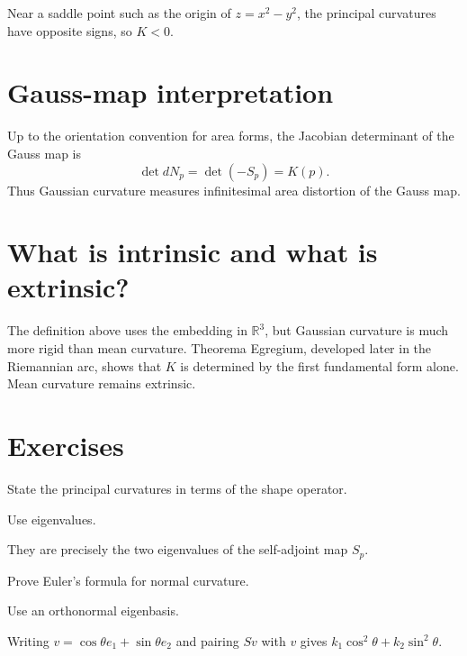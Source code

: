 \begin{example}\label{ex:vii17-saddle}
Near a saddle point such as the origin of \(z=x^2-y^2\), the principal curvatures have opposite signs, so \(K<0\).
\end{example}

\section{Gauss-map interpretation}

\begin{theorem}\label{thm:vii17-gauss-jacobian}
Up to the orientation convention for area forms, the Jacobian determinant of the Gauss map is
\[
\det dN_p=\det(-S_p)=K(p).
\]
Thus Gaussian curvature measures infinitesimal area distortion of the Gauss map.
\end{theorem}

\section{What is intrinsic and what is extrinsic?}

The definition above uses the embedding in \(\mathbb R^3\), but Gaussian curvature is much more rigid than mean curvature. Theorema Egregium, developed later in the Riemannian arc, shows that \(K\) is determined by the first fundamental form alone. Mean curvature remains extrinsic.

\section{Exercises}
\begin{exercise}\label{exr:vii17-01}
State the principal curvatures in terms of the shape operator.
\end{exercise}
\begin{hint}
Use eigenvalues.
\end{hint}
\begin{solution}
They are precisely the two eigenvalues of the self-adjoint map \(S_p\).
\end{solution}

\begin{exercise}\label{exr:vii17-02}
Prove Euler's formula for normal curvature.
\end{exercise}
\begin{hint}
Use an orthonormal eigenbasis.
\end{hint}
\begin{solution}
Writing \(v=\cos\theta e_1+\sin\theta e_2\) and pairing \(Sv\) with \(v\) gives \(k_1\cos^2\theta+k_2\sin^2\theta\).
\end{solution}

